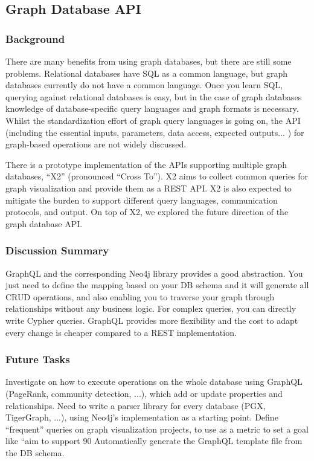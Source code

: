 \documentclass[runningheads]{llncs}
\begin{document}
\subsection{Graph Database API}
\subsubsection{Background}
There are many benefits from using graph databases, but there are still some problems. Relational databases have SQL as a common language, but graph databases currently do not have a common language. Once you learn SQL, querying against relational databases is easy, but in the case of graph databases knowledge of database-specific query languages and graph formats is necessary. Whilst the standardization effort of graph query languages is going on, the API (including the essential inputs, parameters, data access, expected outputs... ) for graph-based operations are not widely discussed.

There is a prototype implementation of the APIs supporting multiple graph databases, “X2” (pronounced “Cross To”). X2 aims to collect common queries for graph visualization and provide them as a REST API. X2 is also expected to mitigate the burden to support different query languages, communication protocols, and output. On top of X2, we explored the future direction of the graph database API.


\subsubsection{Discussion Summary}
GraphQL and the corresponding Neo4j library provides a good abstraction. You just need to define the mapping based on your DB schema and it will generate all CRUD operations, and also enabling you to traverse your graph through relationships without any business logic. For complex queries, you can directly write Cypher queries. GraphQL provides more flexibility and the cost to adapt every change is cheaper compared to a REST implementation.

\subsubsection{Future Tasks}
Investigate on how to execute operations on the whole database using GraphQL (PageRank, community detection, ...), which add or update properties and relationships.
Need to write a parser library for every database (PGX, TigerGraph, ...), using Neo4j’s implementation as a starting point.
Define “frequent” queries on graph visualization projects, to use as a metric to set a goal like “aim to support 90%
Automatically generate the GraphQL template file from the DB schema.
\end{document}
